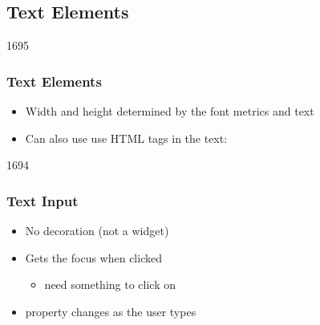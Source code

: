 %
%
%
%

\subsection{Text Elements}

\begin{slide}{1695}\frametitle{Text Elements}


\begin{itemize}
\item Width and height determined by the font metrics and text
\item Can also use use HTML tags in the text:\linebreak {}
\end{itemize}

\end{slide}


\begin{slide}{1694}\frametitle{Text Input}


\begin{itemize}
\item No decoration (not a  widget)
\item Gets the focus when clicked
  \begin{itemize}
  \item need something to click on
  \end{itemize}
\item {} property changes as the user types
\end{itemize}

\end{slide}                                                        
